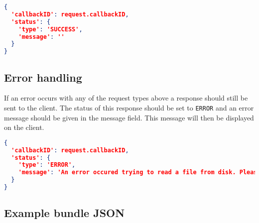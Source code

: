 \documentclass[A4,12pt, utf8]{article}
\begin{document}
\begin{lstlisting}[caption=Reply content, language=json]
{
  'callbackID': request.callbackID,
  'status': {
    'type': 'SUCCESS',
    'message': ''
  }
}
\end{lstlisting}


\subsection{Error handling}

If an error occurs with any of the request types above a response should still be sent to the client. The status of this response should be set to \texttt{ERROR} and an error message should be given in the message field. This message will then be displayed on the client.

\begin{lstlisting}[caption=ERROR reply content, language=json]
{
  'callbackID': request.callbackID,
  'status': {
    'type': 'ERROR',
    'message': 'An error occured trying to read a file from disk. Please make sure: /path/to/file exists or check the config...
  }
}
\end{lstlisting}

\subsection{Example bundle JSON}


\end{document}
